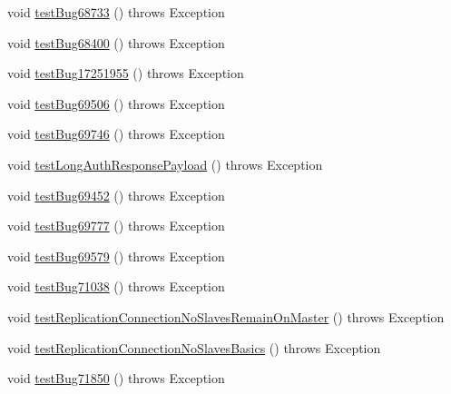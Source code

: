 \begin{DoxyCompactItemize}
\item 
void \mbox{\hyperlink{classtestsuite_1_1regression_1_1_connection_regression_test_a9d54ba5c540e24424893bc15c83312ac}{test\+Bug68733}} ()  throws Exception 
\item 
void \mbox{\hyperlink{classtestsuite_1_1regression_1_1_connection_regression_test_a51c24689dc4bef4ba615be9fc98cf30a}{test\+Bug68400}} ()  throws Exception 
\item 
void \mbox{\hyperlink{classtestsuite_1_1regression_1_1_connection_regression_test_ad677d873884570b76279a42c590dbe5b}{test\+Bug17251955}} ()  throws Exception 
\item 
void \mbox{\hyperlink{classtestsuite_1_1regression_1_1_connection_regression_test_ac8bd9a129a96fb8c9d9c220369e1a5b2}{test\+Bug69506}} ()  throws Exception 
\item 
void \mbox{\hyperlink{classtestsuite_1_1regression_1_1_connection_regression_test_adeeac09d039c69e054e676529af26ca7}{test\+Bug69746}} ()  throws Exception 
\item 
void \mbox{\hyperlink{classtestsuite_1_1regression_1_1_connection_regression_test_a1f2f79b3fda5cc037b1fa079164289a5}{test\+Long\+Auth\+Response\+Payload}} ()  throws Exception 
\item 
void \mbox{\hyperlink{classtestsuite_1_1regression_1_1_connection_regression_test_a83cf8c588a6543301dab7d3afa57042b}{test\+Bug69452}} ()  throws Exception 
\item 
void \mbox{\hyperlink{classtestsuite_1_1regression_1_1_connection_regression_test_a6d62956aba90350317ed7d34d3d6eb39}{test\+Bug69777}} ()  throws Exception 
\item 
void \mbox{\hyperlink{classtestsuite_1_1regression_1_1_connection_regression_test_a09e5aef6835aa4e8cf07bde4c3d06a28}{test\+Bug69579}} ()  throws Exception 
\item 
void \mbox{\hyperlink{classtestsuite_1_1regression_1_1_connection_regression_test_af4f6635f25a74604468a8f9445e365ba}{test\+Bug71038}} ()  throws Exception 
\item 
void \mbox{\hyperlink{classtestsuite_1_1regression_1_1_connection_regression_test_a83ad61ca50bf84278212939dd4caff44}{test\+Replication\+Connection\+No\+Slaves\+Remain\+On\+Master}} ()  throws Exception 
\item 
void \mbox{\hyperlink{classtestsuite_1_1regression_1_1_connection_regression_test_a0c251e168e357e7eeaa670fd0974ac70}{test\+Replication\+Connection\+No\+Slaves\+Basics}} ()  throws Exception 
\item 
void \mbox{\hyperlink{classtestsuite_1_1regression_1_1_connection_regression_test_a4b5713e8080de9926d1add37598cde58}{test\+Bug71850}} ()  throws Exception 

\end{DoxyCompactItemize}
